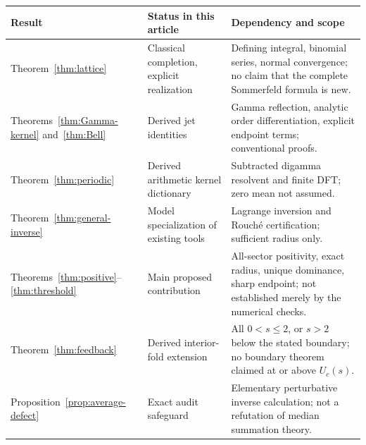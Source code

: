 \documentclass[11pt,a4paper]{article}
\theoremstyle{definition}\newtheorem{definition}[theorem]{Definition}
\theoremstyle{remark}\newtheorem{remark}[theorem]{Remark}
\numberwithin{equation}{section}
\begin{document}
\small
\begin{longtable}{@{}>{\raggedright\arraybackslash}p{}>{\raggedright\arraybackslash}p{}>{\raggedright\arraybackslash}p{}@{}}
\toprule
Result & Status in this article & Dependency and scope\\\midrule
\endhead
Theorem~\ref{thm:lattice} & Classical completion, explicit realization &
Defining integral, binomial series, normal convergence; no claim that the
complete Sommerfeld formula is new.\\[5pt]
Theorems~\ref{thm:Gamma-kernel} and~\ref{thm:Bell} & Derived jet identities &
Gamma reflection, analytic order differentiation, explicit endpoint terms;
conventional proofs.\\[5pt]
Theorem~\ref{thm:periodic} & Derived arithmetic kernel dictionary &
Subtracted digamma resolvent and finite DFT; zero mean not assumed.\\[5pt]
Theorem~\ref{thm:general-inverse} & Model specialization of existing tools &
Lagrange inversion and Rouch\'e certification; sufficient radius only.\\[5pt]
Theorems~\ref{thm:positive}--\ref{thm:threshold} & Main proposed contribution &
All-sector positivity, exact radius, unique dominance, sharp endpoint;
not established merely by the numerical checks.\\[5pt]
Theorem~\ref{thm:feedback} & Derived interior-fold extension &
All $0<s\le2$, or $s>2$ below the stated boundary; no boundary theorem
claimed at or above $U_c(s)$.\\[5pt]
Proposition~\ref{prop:average-defect} & Exact audit safeguard &
Elementary perturbative inverse calculation; not a refutation of median
summation theory.\\\bottomrule
\end{longtable}
\normalsize
\end{document}
